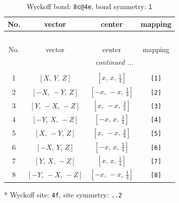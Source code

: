 \documentclass[fleqn,8pt]{jsarticle}
\begin{document}
\renewcommand{\arraystretch}{1.2}
\begin{longtable}{cccc}
\caption{Wyckoff bond: {\tt 8c@4e}, bond symmetry: {\tt 1}}
 \\
 \hline \hline
No. & vector & center & mapping \\ \hline \endfirsthead

\multicolumn{3}{l}{\tablename\ \thetable{}} \\
 \hline \hline
No. & vector & center & mapping \\ \hline \endhead

 \hline \hline
\multicolumn{3}{r}{\footnotesize\it continued ...} \\ \endfoot

 \hline \hline
\multicolumn{3}{r}{} \\ \endlastfoot

1 & $\left[ X,\, Y,\, Z \right]$ & $\left[ x,\, x,\, \frac{1}{4} \right]$ & {\tt [1]} \\ \hline
2 & $\left[ - X,\, - Y,\, Z \right]$ & $\left[ - x,\, - x,\, \frac{1}{4} \right]$ & {\tt [2]} \\ \hline
3 & $\left[ Y,\, - X,\, - Z \right]$ & $\left[ x,\, - x,\, \frac{3}{4} \right]$ & {\tt [3]} \\ \hline
4 & $\left[ - Y,\, X,\, - Z \right]$ & $\left[ - x,\, x,\, \frac{3}{4} \right]$ & {\tt [4]} \\ \hline
5 & $\left[ X,\, - Y,\, Z \right]$ & $\left[ x,\, - x,\, \frac{3}{4} \right]$ & {\tt [5]} \\ \hline
6 & $\left[ - X,\, Y,\, Z \right]$ & $\left[ - x,\, x,\, \frac{3}{4} \right]$ & {\tt [6]} \\ \hline
7 & $\left[ Y,\, X,\, - Z \right]$ & $\left[ x,\, x,\, \frac{1}{4} \right]$ & {\tt [7]} \\ \hline
8 & $\left[ - Y,\, - X,\, - Z \right]$ & $\left[ - x,\, - x,\, \frac{1}{4} \right]$ & {\tt [8]} \\
\end{longtable}
* Wyckoff site: {\tt 4f}, site symmetry: {\tt ..2}
\renewcommand{\arraystretch}{1.2}
\end{document}
